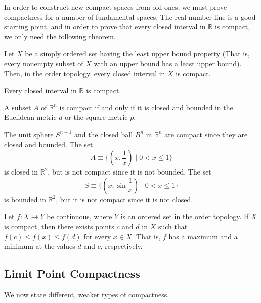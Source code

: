     In order to construct new compact spaces from old ones, we must prove compactness for a number of fundamental spaces. The real number line is a good starting point, and in order to prove that every closed interval in $\mathbb{R}$ is compact, we only need the following theorem. 

    \begin{theorem}
    Let $X$ be a simply ordered set having the least upper bound property (That is, every nonempty subset of $X$ with an upper bound has a least upper bound). Then, in the order topology, every closed interval in $X$ is compact. 
    \end{theorem}

    \begin{corollary}
    Every closed interval in $\mathbb{R}$ is compact. 
    \end{corollary}

    \begin{theorem}
    A subset $A$ of $\mathbb{R}^n$ is compact if and only if it is closed and bounded in the Euclidean metric $d$ or the square metric $p$. 
    \end{theorem}

    \begin{example}
    The unit sphere $S^{n-1}$ and the closed ball $B^n$ in $\mathbb{R}^n$ are compact since they are closed and bounded. The set
    \[A \equiv \{(x, \frac{1}{x}) \; | \; 0 < x \leq 1\}\]
    is closed in $\mathbb{R}^2$, but is not compact since it is not bounded. The set 
    \[S \equiv \{(x, \sin{\frac{1}{x}}) \; | \; 0<x\leq 1\}\]
    is bounded in $\mathbb{R}^2$, but it is not compact since it is not closed. 
    \end{example}

    \begin{theorem}
    Let $f: X \longrightarrow Y$ be continuous, where $Y$ is an ordered set in the order topology. If $X$ is compact, then there exists points $c$ and $d$ in $X$ such that $f(c) \leq f(x) \leq f(d)$ for every $x \in X$. That is, $f$ has a maximum and a minimum at the values $d$ and $c$, respectively. 
    \end{theorem}

  \subsection{Limit Point Compactness}

    We now state different, weaker types of compactness. 

